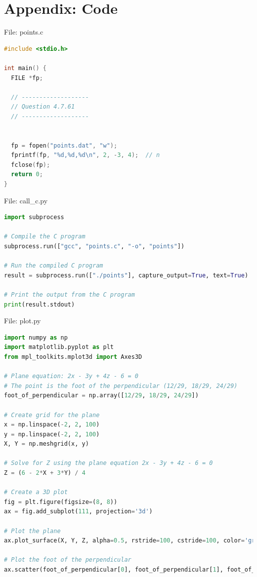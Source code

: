 \documentclass{beamer}
\numberwithin{equation}{section}
\theoremstyle{remark}
\begin{document}
\section*{Appendix: Code}

\begin{frame}[fragile]{File: points.c}
\begin{lstlisting}[language=C]
#include <stdio.h>

int main() {
  FILE *fp;

  // -------------------
  // Question 4.7.61
  // -------------------


  fp = fopen("points.dat", "w");
  fprintf(fp, "%d,%d,%d\n", 2, -3, 4);  // n
  fclose(fp);
  return 0;
}
\end{lstlisting}
\end{frame}

\begin{frame}[fragile]{File: call\_c.py}
\begin{lstlisting}[language=Python]
import subprocess

# Compile the C program
subprocess.run(["gcc", "points.c", "-o", "points"])

# Run the compiled C program
result = subprocess.run(["./points"], capture_output=True, text=True)

# Print the output from the C program
print(result.stdout)
\end{lstlisting}
\end{frame}

\begin{frame}[fragile]{File: plot.py}
\begin{lstlisting}[language=Python]
import numpy as np
import matplotlib.pyplot as plt
from mpl_toolkits.mplot3d import Axes3D

# Plane equation: 2x - 3y + 4z - 6 = 0
# The point is the foot of the perpendicular (12/29, 18/29, 24/29)
foot_of_perpendicular = np.array([12/29, 18/29, 24/29])

# Create grid for the plane
x = np.linspace(-2, 2, 100)
y = np.linspace(-2, 2, 100)
X, Y = np.meshgrid(x, y)

# Solve for Z using the plane equation 2x - 3y + 4z - 6 = 0
Z = (6 - 2*X + 3*Y) / 4

# Create a 3D plot
fig = plt.figure(figsize=(8, 8))
ax = fig.add_subplot(111, projection='3d')

# Plot the plane
ax.plot_surface(X, Y, Z, alpha=0.5, rstride=100, cstride=100, color='gray', edgecolor='k')

# Plot the foot of the perpendicular
ax.scatter(foot_of_perpendicular[0], foot_of_perpendicular[1], foot_of_perpendicular[2], color='g', s=10, label='Foot of Perpendicular')
\end{lstlisting}
\end{frame}
\end{document}
